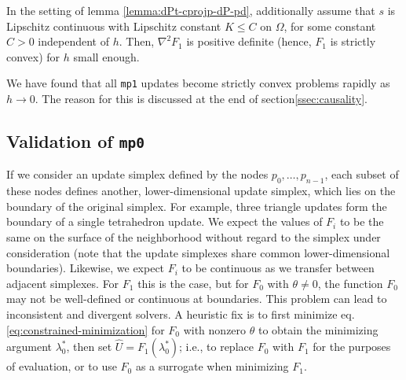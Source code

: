 \documentclass[smallcondensed]{svjour3}
\begin{document}
\begin{lemma}\label{lemma:F-strictly-convex}
  In the setting of lemma \ref{lemma:dPt-cprojp-dP-pd}, additionally
  assume that $s$ is Lipschitz continuous with Lipschitz constant
  $K \leq C$ on $\Omega$, for some constant $C > 0$ independent of
  $h$. Then, $\nabla^2 F_1$ is positive definite (hence, $F_1$ is
  strictly convex) for $h$ small enough.
\end{lemma}

We have found that all \texttt{mp1} updates become strictly convex
problems rapidly as $h \to 0$. The reason for this is discussed at the
end of section\@ \ref{ssec:causality}.

\subsection{Validation of \texttt{mp0}}\label{ssec:validation}

If we consider an update simplex defined by the nodes
$p_0, \hdots, p_{n-1}$, each subset of these nodes defines another,
lower-dimensional update simplex, which lies on the boundary of the
original simplex. For example, three triangle updates form the
boundary of a single tetrahedron update. We expect the values of $F_i$
to be the same on the surface of the neighborhood without regard to
the simplex under consideration (note that the update simplexes share
common lower-dimensional boundaries). Likewise, we expect $F_i$ to be
continuous as we transfer between adjacent simplexes. For $F_1$ this
is the case, but for $F_0$ with $\theta \neq 0$, the function $F_0$
may not be well-defined or continuous at boundaries. This problem can
lead to inconsistent and divergent solvers. A heuristic fix is to
first minimize eq.\@ \ref{eq:constrained-minimization} for $F_0$
with nonzero $\theta$ to obtain the minimizing argument $\lambda^*_0$,
then set $\hat{U} = F_1(\lambda_0^*)$; i.e., to replace $F_0$ with
$F_1$ for the purposes of evaluation, or to use $F_0$ as a surrogate
when minimizing $F_1$.
\end{document}
